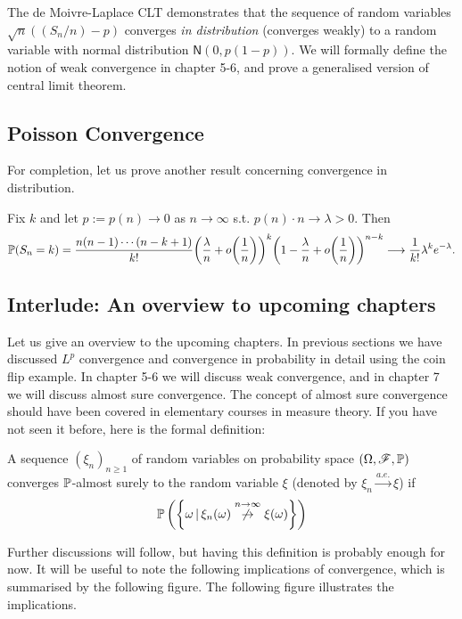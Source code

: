 The de Moivre-Laplace CLT demonstrates that the sequence of random variables $\sqrt{n}((S_n/n) - p)$ converges \textit{in distribution} (converges weakly) to a random variable with normal distribution $\mathsf{N}(0,p(1-p))$. We will formally define the notion of weak convergence in chapter 5-6, and prove a generalised version of central limit theorem.

\subsection{Poisson Convergence}
For completion, let us prove another result concerning convergence in distribution.
\begin{theorem}
Fix $k$ and let $p := p(n) \rightarrow 0$ as $n\rightarrow \infty$ s.t. $p(n) \cdot n \rightarrow \lambda >0$. Then 
\begin{equation}
    \mathbb{P}(S_n =k) = \frac{n(n-1)\cdots(n-k+1)}{k!} \bigg(\frac{\lambda}{n} + o\bigg(\frac{1}{n}\bigg)\bigg)^k \bigg(1 - \frac{\lambda}{n} + o\bigg(\frac{1}{n}\bigg) \bigg)^{n-k} \longrightarrow \frac{1}{k!} \lambda^k e^{-\lambda}.
\end{equation}
\end{theorem}

\subsection{Interlude: An overview to upcoming chapters}
Let us give an overview to the upcoming chapters. In previous sections we have discussed $L^p$ convergence and convergence in probability in detail using the coin flip example. In chapter 5-6 we will discuss weak convergence, and in chapter 7 we will discuss almost sure convergence. The concept of almost sure convergence should have been covered in elementary courses in measure theory. If you have not seen it before, here is the formal definition:

\begin{definition}
A sequence $(\xi_n)_{n\geq 1}$ of random variables on probability space $(\Omega,\mathcal{F},\mathbb{P})$ converges $\mathbb{P}$-almost surely to the random variable $\xi$ (denoted by $\xi_n \overset{a.e.}{\to} \xi$) if 
\begin{equation}
    \mathbb{P}\left( \left\{ \omega\,|\, \xi_n(\omega) \overset{n\to\infty}{\not\to} \xi(\omega) \right \} \right)
\end{equation}
\end{definition}

Further discussions will follow, but having this definition is probably enough for now. It will be useful to note the following implications of convergence, which is summarised by the following figure. The following figure illustrates the implications.


